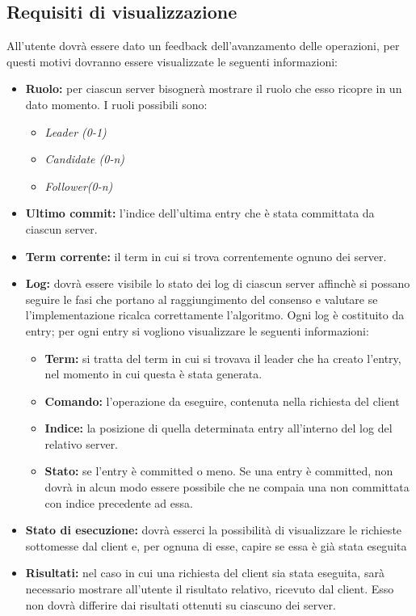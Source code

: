 	\subsection{Requisiti di visualizzazione}
	All'utente dovrà essere dato un feedback dell'avanzamento delle operazioni, per questi motivi dovranno essere visualizzate le seguenti informazioni: 
		\begin{itemize}
			\item \textbf{Ruolo:} per ciascun server bisognerà mostrare il ruolo che esso ricopre in un dato momento. I ruoli possibili sono:
				\begin{itemize}
					\item \emph{Leader (0-1)}
					\item \emph{Candidate (0-n)}
					\item \emph{Follower(0-n)}
				\end{itemize}
			\item \textbf{Ultimo commit:} l'indice dell'ultima entry che è stata committata da ciascun server.
			\item \textbf{Term corrente:} il term in cui si trova correntemente ognuno dei server.
			\item \textbf{Log:} dovrà essere visibile lo stato dei log di ciascun server affinchè si possano seguire le fasi che portano al raggiungimento del consenso e valutare se l'implementazione ricalca correttamente l'algoritmo. Ogni log è costituito da entry; per ogni entry si vogliono visualizzare le seguenti informazioni:
				\begin{itemize}
					\item \textbf{Term:} si tratta del term in cui si trovava il leader che ha creato l'entry, nel momento in cui questa è stata generata. 
					\item \textbf{Comando:} l'operazione da eseguire, contenuta nella richiesta del client 
					\item \textbf{Indice:} la posizione di quella determinata entry all'interno del log del relativo server.
					\item \textbf{Stato:} se l'entry è committed o meno. Se una entry è committed, non dovrà in alcun modo essere possibile che ne compaia una non committata con indice precedente ad essa.
				\end{itemize} 
			\item \textbf{Stato di esecuzione:} dovrà esserci la possibilità di visualizzare le richieste sottomesse dal client e, per ognuna di esse, capire se essa è già stata eseguita
			\item \textbf{Risultati:} nel caso in cui una richiesta del client sia stata eseguita, sarà necessario mostrare all'utente il risultato relativo, ricevuto dal client. Esso non dovrà differire dai risultati ottenuti su ciascuno dei server.
		\end{itemize}

